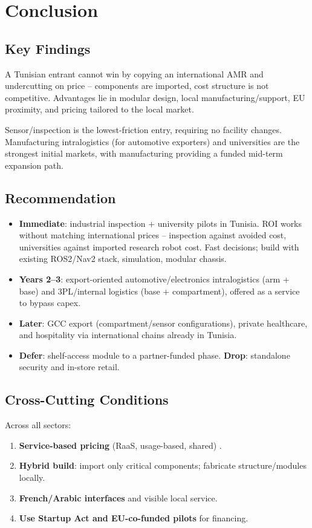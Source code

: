 \chapter{Conclusion}

\section{Key Findings}
A Tunisian entrant cannot win by copying an international AMR and undercutting on price -- components are imported, cost structure is not competitive. Advantages lie in modular design, local manufacturing/support, EU proximity, and pricing tailored to the local market.

Sensor/inspection is the lowest-friction entry, requiring no facility changes. Manufacturing intralogistics (for automotive exporters) and universities are the strongest initial markets, with manufacturing providing a funded mid-term expansion path.
\section{Recommendation}
\begin{itemize}
    \item \textbf{Immediate}: industrial inspection + university pilots in Tunisia. ROI works without matching international prices -- inspection against avoided cost, universities against imported research robot cost. Fast decisions; build with existing ROS2/Nav2 stack, simulation, modular chassis.
    \item \textbf{Years 2--3}: export-oriented automotive/electronics intralogistics (arm + base) and 3PL/internal logistics (base + compartment), offered as a service to bypass capex.
    \item \textbf{Later}: GCC export (compartment/sensor configurations), private healthcare, and hospitality via international chains already in Tunisia.
    \item \textbf{Defer}: shelf-access module to a partner-funded phase. \textbf{Drop}: standalone security and in-store retail.
\end{itemize}

\section{Cross-Cutting Conditions}

Across all sectors:
\begin{enumerate}
    \item \textbf{Service-based pricing} (RaaS, usage-based, shared) \cite{builtin_raas}.
    \item \textbf{Hybrid build}: import only critical components; fabricate structure/modules locally.
    \item \textbf{French/Arabic interfaces} and visible local service.
    \item \textbf{Use Startup Act and EU-co-funded pilots} for financing.
\end{enumerate}
